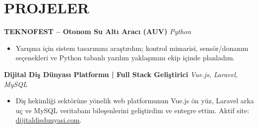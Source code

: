 
\section{PROJELER}

\textbf{TEKNOFEST – Otonom Su Altı Aracı (AUV)} \hfill \textit{Python}
\begin{itemize}
    \item Yarışma için sistem tasarımını araştırdım; kontrol mimarisi, sensör/donanım seçenekleri ve Python tabanlı yazılım yaklaşımını ekip içinde planladım.
\end{itemize}

\vspace{4pt}

\noindent \textbf{Dijital Diş Dünyası Platformu | Full Stack Geliştirici} \hfill \textit{Vue.js, Laravel, MySQL}
\begin{itemize}
    \item Diş hekimliği sektörüne yönelik web platformunun Vue.js ön yüz, Laravel arka uç ve MySQL veritabanı bileşenlerini geliştirdim ve entegre ettim. Aktif site: \href{https://dijitaldisdunyasi.com/}{dijitaldisdunyasi.com}.
\end{itemize}
